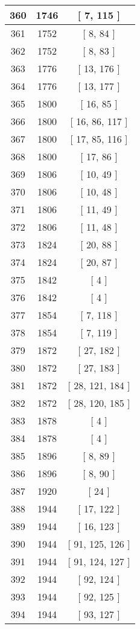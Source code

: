 \begin{center}
\begin{longtable}[H]{|| c c c ||}
\hline
360 & 1746 & [ 7, 115 ] \\ 
\hline
361 & 1752 & [ 8, 84 ] \\ 
\hline
362 & 1752 & [ 8, 83 ] \\ 
\hline
363 & 1776 & [ 13, 176 ] \\ 
\hline
364 & 1776 & [ 13, 177 ] \\ 
\hline
365 & 1800 & [ 16, 85 ] \\ 
\hline
366 & 1800 & [ 16, 86, 117 ] \\ 
\hline
367 & 1800 & [ 17, 85, 116 ] \\ 
\hline
368 & 1800 & [ 17, 86 ] \\ 
\hline
369 & 1806 & [ 10, 49 ] \\ 
\hline
370 & 1806 & [ 10, 48 ] \\ 
\hline
371 & 1806 & [ 11, 49 ] \\ 
\hline
372 & 1806 & [ 11, 48 ] \\ 
\hline
373 & 1824 & [ 20, 88 ] \\ 
\hline
374 & 1824 & [ 20, 87 ] \\ 
\hline
375 & 1842 & [ 4 ] \\ 
\hline
376 & 1842 & [ 4 ] \\ 
\hline
377 & 1854 & [ 7, 118 ] \\ 
\hline
378 & 1854 & [ 7, 119 ] \\ 
\hline
379 & 1872 & [ 27, 182 ] \\ 
\hline
380 & 1872 & [ 27, 183 ] \\ 
\hline
381 & 1872 & [ 28, 121, 184 ] \\ 
\hline
382 & 1872 & [ 28, 120, 185 ] \\ 
\hline
383 & 1878 & [ 4 ] \\ 
\hline
384 & 1878 & [ 4 ] \\ 
\hline
385 & 1896 & [ 8, 89 ] \\ 
\hline
386 & 1896 & [ 8, 90 ] \\ 
\hline
387 & 1920 & [ 24 ] \\ 
\hline
388 & 1944 & [ 17, 122 ] \\ 
\hline
389 & 1944 & [ 16, 123 ] \\ 
\hline
390 & 1944 & [ 91, 125, 126 ] \\ 
\hline
391 & 1944 & [ 91, 124, 127 ] \\ 
\hline
392 & 1944 & [ 92, 124 ] \\ 
\hline
393 & 1944 & [ 92, 125 ] \\ 
\hline
394 & 1944 & [ 93, 127 ] \\ 

\end{longtable}
\end{center}
